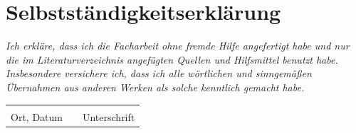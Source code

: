 \documentclass[11pt, a4paper, oneside, openright]{article}
\begin{document}
\newpage
\section*{Selbstständigkeitserklärung}

\emph{Ich erkläre, dass ich die Facharbeit ohne fremde Hilfe angefertigt habe und nur die im Literaturverzeichnis angefügten Quellen und Hilfsmittel benutzt habe. Insbesondere versichere ich, dass ich alle wörtlichen und sinngemäßen Übernahmen aus anderen Werken als solche kenntlich gemacht habe.}

\vspace{2cm}

\noindent
\begin{tabular}{p{5cm}p{1.5cm}p{5cm}}
    \hspace{6cm}  &  &  \hspace{6cm}\\
    \cline{1-1}         \cline{3-3}
    Ort, Datum    &  &  Unterschrift
\end{tabular}
\end{document}
